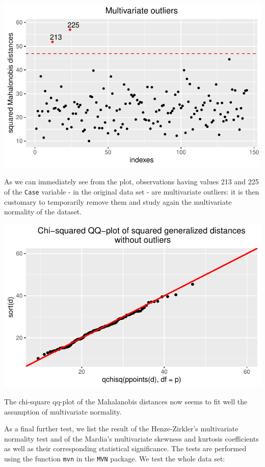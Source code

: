 \documentclass[
  letterpaper,
  DIV=11,
  numbers=noendperiod]{scrartcl}
\begin{document}
\includegraphics{ProblemSet2_files/figure-pdf/unnamed-chunk-10-1.pdf}

As we can immediately see from the plot, observations having values 213
and 225 of the \texttt{Case} variable - in the original data set - are
multivariate outliers: it is then customary to temporarily remove them
and study again the multivariate normality of the dataset.

\includegraphics{ProblemSet2_files/figure-pdf/unnamed-chunk-11-1.pdf}

The chi-square qq-plot of the Mahalanobis distances now seems to fit
well the assumption of multivariate normality.

As a final further test, we list the result of the Henze-Zirkler's
multivariate normality test and of the Mardia's multivariate skewness
and kurtosis coefficients as well as their corresponding statistical
significance. The tests are performed using the function \texttt{mvn} in
the \texttt{MVN} package. We test the whole data set:
\end{document}
